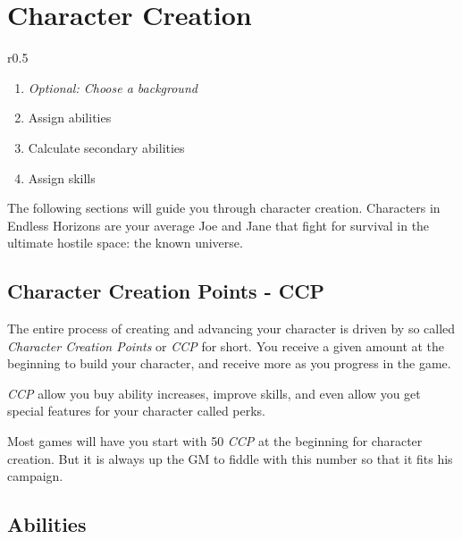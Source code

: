 \chapter{Character Creation}
\label{chap:Character Creation}

\begin{wrapfigure}{r}{0.5\textwidth}
  \vspace{-20pt}
  \begin{mdframed}[skipabove=0pt,skipbelow=0pt,frametitlerule=true,frametitle={Character creation outline}]
    \begin{enumerate}
      \item \emph{Optional: Choose a background}
      \item Assign abilities
      \item Calculate secondary abilities
      \item Assign skills
    \end{enumerate}
  \end{mdframed}
  \vspace{-40pt}
\end{wrapfigure}

The following sections will guide you through character creation. Characters
in Endless Horizons are your average Joe and Jane that fight for survival
in the ultimate hostile space: the known universe.

\section{Character Creation Points - CCP}
\label{sec:2-Character Creation Points}

The entire process of creating and advancing your character is driven by so
called \emph{Character Creation Points} or \emph{CCP} for short. You receive
a given amount at the beginning to build your character, and receive more as
you progress in the game.

\emph{CCP} allow you buy ability increases, improve skills, and even allow you
get special features for your character called perks.

Most games will have you start with 50 \emph{CCP} at the beginning for character
creation. But it is always up the GM to fiddle with this number so that it fits
his campaign.

\section{Abilities}
\label{sec:2-Abilities}

